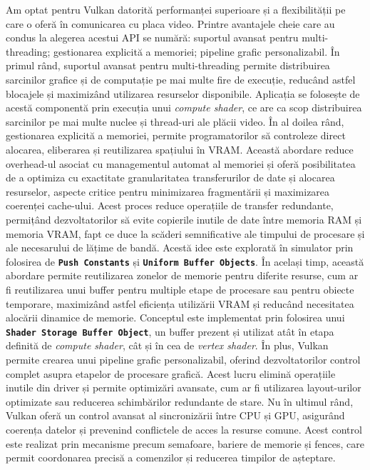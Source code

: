 Am optat pentru Vulkan datorită performanței superioare și a flexibilității pe care o oferă în comunicarea cu placa video. Printre avantajele cheie care au condus la alegerea acestui API se numără: suportul avansat pentru multi-threading; gestionarea explicită a memoriei; pipeline grafic personalizabil. În primul rând, suportul avansat pentru multi-threading permite distribuirea sarcinilor grafice și de computație pe mai multe fire de execuție, reducând astfel blocajele și maximizând utilizarea resurselor disponibile. Aplicația se folosește de acestă componentă prin execuția unui \textit{compute shader}, ce are ca scop distribuirea sarcinilor pe mai multe nuclee și thread-uri ale plăcii video. În al doilea rând, gestionarea explicită a memoriei, permite programatorilor să controleze direct alocarea, eliberarea și reutilizarea spațiului în VRAM. Această abordare reduce overhead-ul asociat cu managementul automat al memoriei și oferă posibilitatea de a optimiza cu exactitate granularitatea transferurilor de date și alocarea resurselor, aspecte critice pentru minimizarea fragmentării și maximizarea coerenței cache-ului. Acest proces reduce operațiile de transfer redundante, permițând dezvoltatorilor să evite copierile inutile de date între memoria RAM și memoria VRAM, fapt ce duce la scăderi semnificative ale timpului de procesare și ale necesarului de lățime de bandă. Acestă idee este explorată în simulator prin folosirea de \textbf{\texttt{Push Constants}} și \textbf{\texttt{Uniform Buffer Objects}}. În același timp, această abordare permite reutilizarea zonelor de memorie pentru diferite resurse, cum ar fi reutilizarea unui buffer pentru multiple etape de procesare sau pentru obiecte temporare, maximizând astfel eficiența utilizării VRAM și reducând necesitatea alocării dinamice de memorie. Conceptul este implementat prin folosirea unui \textbf{\texttt{Shader Storage Buffer Object}}, un buffer prezent și utilizat atât în etapa definită de \textit{compute shader}, cât și în cea de \textit{vertex shader}. În plus, Vulkan permite crearea unui pipeline grafic personalizabil, oferind dezvoltatorilor control complet asupra etapelor de procesare grafică. Acest lucru elimină operațiile inutile din driver și permite optimizări avansate, cum ar fi utilizarea layout-urilor optimizate sau reducerea schimbărilor redundante de stare. Nu în ultimul rând, Vulkan oferă un control avansat al sincronizării între CPU și GPU, asigurând coerența datelor și prevenind conflictele de acces la resurse comune. Acest control este realizat prin mecanisme precum semafoare, bariere de memorie și fences, care permit coordonarea precisă a comenzilor și reducerea timpilor de așteptare.

